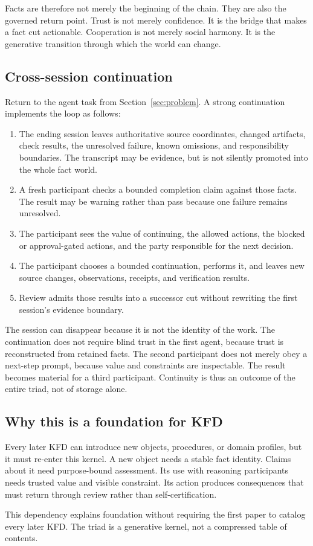 Facts are therefore not merely the beginning of the chain. They are also the
governed return point. Trust is not merely confidence. It is the bridge that
makes a fact cut actionable. Cooperation is not merely social harmony. It is
the generative transition through which the world can change.

\subsection{Cross-session continuation}

Return to the agent task from Section~\ref{sec:problem}. A strong continuation
implements the loop as follows:

\begin{enumerate}[leftmargin=*]
  \item The ending session leaves authoritative source coordinates, changed
        artifacts, check results, the unresolved failure, known omissions, and
        responsibility boundaries. The transcript may be evidence, but is not
        silently promoted into the whole fact world.
  \item A fresh participant checks a bounded completion claim against those
        facts. The result may be warning rather than pass because one failure
        remains unresolved.
  \item The participant sees the value of continuing, the allowed actions,
        the blocked or approval-gated actions, and the party responsible for
        the next decision.
  \item The participant chooses a bounded continuation, performs it, and
        leaves new source changes, observations, receipts, and verification
        results.
  \item Review admits those results into a successor cut without rewriting
        the first session's evidence boundary.
\end{enumerate}

The session can disappear because it is not the identity of the work. The
continuation does not require blind trust in the first agent, because trust is
reconstructed from retained facts. The second participant does not merely
obey a next-step prompt, because value and constraints are inspectable. The
result becomes material for a third participant. Continuity is thus an outcome
of the entire triad, not of storage alone.

\subsection{Why this is a foundation for KFD}

Every later KFD can introduce new objects, procedures, or domain profiles, but
it must re-enter this kernel. A new object needs a stable fact identity. Claims
about it need purpose-bound assessment. Its use with reasoning participants
needs trusted value and visible constraint. Its action produces consequences
that must return through review rather than self-certification.

This dependency explains foundation without requiring the first paper to
catalog every later KFD. The triad is a generative kernel, not a compressed
table of contents.
